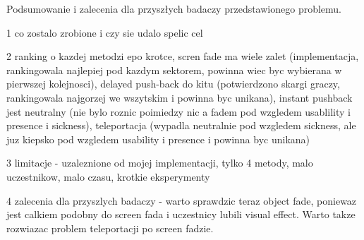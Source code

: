 Podsumowanie i zalecenia dla przyszłych badaczy przedstawionego problemu.

1 co zostalo zrobione i czy sie udalo spelic cel

2 ranking o kazdej metodzi epo krotce, scren fade ma wiele zalet (implementacja, rankingowala najlepiej pod kazdym sektorem, powinna wiec byc wybierana w pierwszej kolejnosci), delayed push-back do kitu (potwierdzono skargi graczy, rankingowala najgorzej we wszytskim i powinna byc unikana), instant pushback jest neutralny (nie bylo roznic poimiedzy nic a fadem pod wzgledem usablility i presence i sickness), teleportacja (wypadla neutralnie pod wzgledem sickness, ale juz kiepsko pod wzgledem usability i presence i powinna byc unikana)

3 limitacje - uzaleznione od mojej implementacji, tylko 4 metody, malo uczestnikow, malo czasu, krotkie eksperymenty

4 zalecenia dla przyszlych badaczy - warto sprawdzic teraz object fade, poniewaz jest calkiem podobny do screen fada i uczestnicy lubili visual effect. Warto takze rozwiazac problem teleportacji po screen fadzie.
